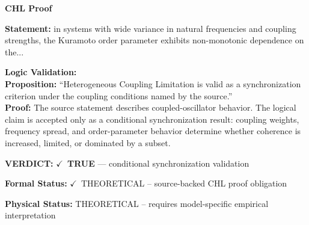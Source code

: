 \vspace{0.45em}
\noindent\textbf{CHL Proof}\par
\textbf{Statement:} in systems with wide variance in natural frequencies and coupling strengths, the
Kuramoto order parameter exhibits non-monotonic dependence on the...

\textbf{Logic Validation:}\\
\textbf{Proposition:} ``Heterogeneous Coupling Limitation is valid as a synchronization criterion under the
coupling conditions named by the source.''\\
\textbf{Proof:} The source statement describes coupled-oscillator behavior. The logical claim is
accepted only as a conditional synchronization result: coupling weights, frequency
spread, and order-parameter behavior determine whether coherence is increased, limited,
or dominated by a subset.

\textbf{VERDICT:} \ensuremath{\checkmark}\ \textbf{TRUE} --- conditional synchronization validation

\textbf{Formal Status:} \ensuremath{\checkmark}\ THEORETICAL -- source-backed CHL proof obligation

\textbf{Physical Status:} THEORETICAL -- requires model-specific empirical interpretation
\par\vspace{0.45em}
\par
\ifTZPDarkEdition
{}
\fi
\endgroup
\endgroup
